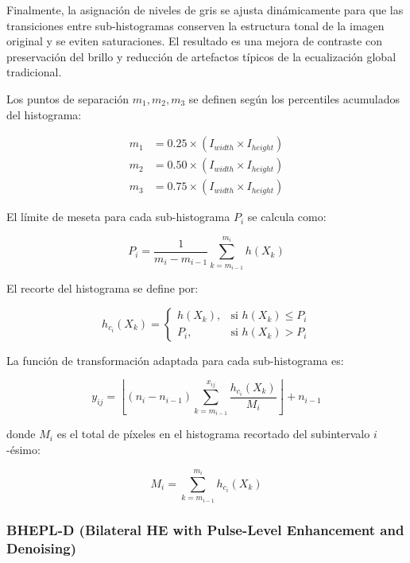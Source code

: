 \documentclass[sigchi]{acmart}
\begin{document}
Finalmente, la asignación de niveles de gris se ajusta dinámicamente para que las transiciones
entre sub-histogramas conserven la estructura tonal de la imagen original y se eviten
saturaciones. El resultado es una mejora de contraste con preservación del brillo y reducción
de artefactos típicos de la ecualización global tradicional.

Los puntos de separación \( m_1, m_2, m_3 \) se definen según los percentiles acumulados del
histograma:

\begin{align}
	m_1 & = 0.25 \times (I_{width} \times I_{height}) \\
	m_2 & = 0.50 \times (I_{width} \times I_{height}) \\
	m_3 & = 0.75 \times (I_{width} \times I_{height})
\end{align}

El límite de meseta para cada sub-histograma \( P_i \) se calcula como:

\begin{equation}
	P_i = \frac{1}{m_i - m_{i-1}} \sum_{k = m_{i-1}}^{m_i} h(X_k)
\end{equation}

El recorte del histograma se define por:

\begin{equation}
	h_{c_i}(X_k) =
	\begin{cases}
		h(X_k), & \text{si } h(X_k) \leq P_i \\
		P_i,    & \text{si } h(X_k) > P_i
	\end{cases}
\end{equation}

La función de transformación adaptada para cada sub-histograma es:

\begin{equation}
	y_{ij} = \left\lfloor (n_i - n_{i-1}) \sum_{k = m_{i-1}}^{x_{ij}} \frac{h_{c_i}(X_k)}{M_i} \right\rfloor + n_{i-1}
\end{equation}

donde \( M_i \) es el total de píxeles en el histograma recortado del subintervalo \( i \)-ésimo:

\begin{equation}
	M_i = \sum_{k = m_{i-1}}^{m_i} h_{c_i}(X_k)
\end{equation}

\subsubsection{\textbf{BHEPL-D (Bilateral HE with Pulse-Level Enhancement and Denoising)}}
\label{sssec:bhepl-d}
\end{document}
